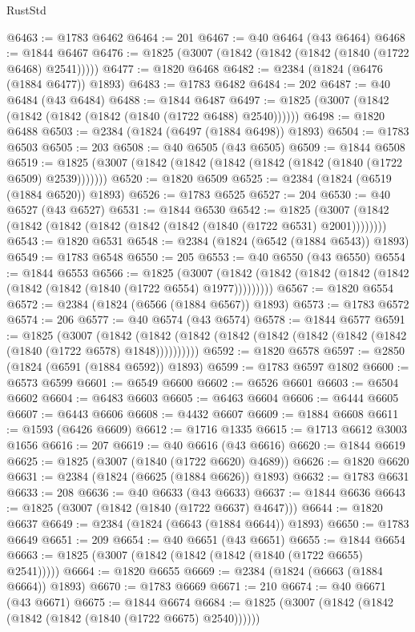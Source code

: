 \begin{lexlean}{RustStd}
\begin{coremodule}
@6463 := @1783 @6462
@6464 := 201
@6467 := @40 @6464 (@43 @6464)
@6468 := @1844 @6467
@6476 := @1825 (@3007 (@1842 (@1842 (@1842 (@1840 (@1722 @6468) @2541)))))
@6477 := @1820 @6468
@6482 := @2384 (@1824 (@6476 (@1884 @6477)) @1893)
@6483 := @1783 @6482
@6484 := 202
@6487 := @40 @6484 (@43 @6484)
@6488 := @1844 @6487
@6497 := @1825 (@3007 (@1842 (@1842 (@1842 (@1842 (@1840 (@1722 @6488) @2540))))))
@6498 := @1820 @6488
@6503 := @2384 (@1824 (@6497 (@1884 @6498)) @1893)
@6504 := @1783 @6503
@6505 := 203
@6508 := @40 @6505 (@43 @6505)
@6509 := @1844 @6508
@6519 := @1825 (@3007 (@1842 (@1842 (@1842 (@1842 (@1842 (@1840 (@1722 @6509) @2539)))))))
@6520 := @1820 @6509
@6525 := @2384 (@1824 (@6519 (@1884 @6520)) @1893)
@6526 := @1783 @6525
@6527 := 204
@6530 := @40 @6527 (@43 @6527)
@6531 := @1844 @6530
@6542 := @1825 (@3007 (@1842 (@1842 (@1842 (@1842 (@1842 (@1842 (@1840 (@1722 @6531) @2001))))))))
@6543 := @1820 @6531
@6548 := @2384 (@1824 (@6542 (@1884 @6543)) @1893)
@6549 := @1783 @6548
@6550 := 205
@6553 := @40 @6550 (@43 @6550)
@6554 := @1844 @6553
@6566 := @1825
    (@3007 (@1842 (@1842 (@1842 (@1842 (@1842 (@1842 (@1842 (@1840 (@1722 @6554) @1977)))))))))
@6567 := @1820 @6554
@6572 := @2384 (@1824 (@6566 (@1884 @6567)) @1893)
@6573 := @1783 @6572
@6574 := 206
@6577 := @40 @6574 (@43 @6574)
@6578 := @1844 @6577
@6591 := @1825
    (@3007
      (@1842 (@1842 (@1842 (@1842 (@1842 (@1842 (@1842 (@1842 (@1840 (@1722 @6578) @1848))))))))))
@6592 := @1820 @6578
@6597 := @2850 (@1824 (@6591 (@1884 @6592)) @1893)
@6599 := @1783 @6597 @1802
@6600 := @6573 @6599
@6601 := @6549 @6600
@6602 := @6526 @6601
@6603 := @6504 @6602
@6604 := @6483 @6603
@6605 := @6463 @6604
@6606 := @6444 @6605
@6607 := @6443 @6606
@6608 := @4432 @6607
@6609 := @1884 @6608
@6611 := @1593 (@6426 @6609)
@6612 := @1716 @1335
@6615 := @1713 @6612 @3003 @1656
@6616 := 207
@6619 := @40 @6616 (@43 @6616)
@6620 := @1844 @6619
@6625 := @1825 (@3007 (@1840 (@1722 @6620) @4689))
@6626 := @1820 @6620
@6631 := @2384 (@1824 (@6625 (@1884 @6626)) @1893)
@6632 := @1783 @6631
@6633 := 208
@6636 := @40 @6633 (@43 @6633)
@6637 := @1844 @6636
@6643 := @1825 (@3007 (@1842 (@1840 (@1722 @6637) @4647)))
@6644 := @1820 @6637
@6649 := @2384 (@1824 (@6643 (@1884 @6644)) @1893)
@6650 := @1783 @6649
@6651 := 209
@6654 := @40 @6651 (@43 @6651)
@6655 := @1844 @6654
@6663 := @1825 (@3007 (@1842 (@1842 (@1842 (@1840 (@1722 @6655) @2541)))))
@6664 := @1820 @6655
@6669 := @2384 (@1824 (@6663 (@1884 @6664)) @1893)
@6670 := @1783 @6669
@6671 := 210
@6674 := @40 @6671 (@43 @6671)
@6675 := @1844 @6674
@6684 := @1825 (@3007 (@1842 (@1842 (@1842 (@1842 (@1840 (@1722 @6675) @2540))))))

\end{coremodule}
\end{lexlean}
